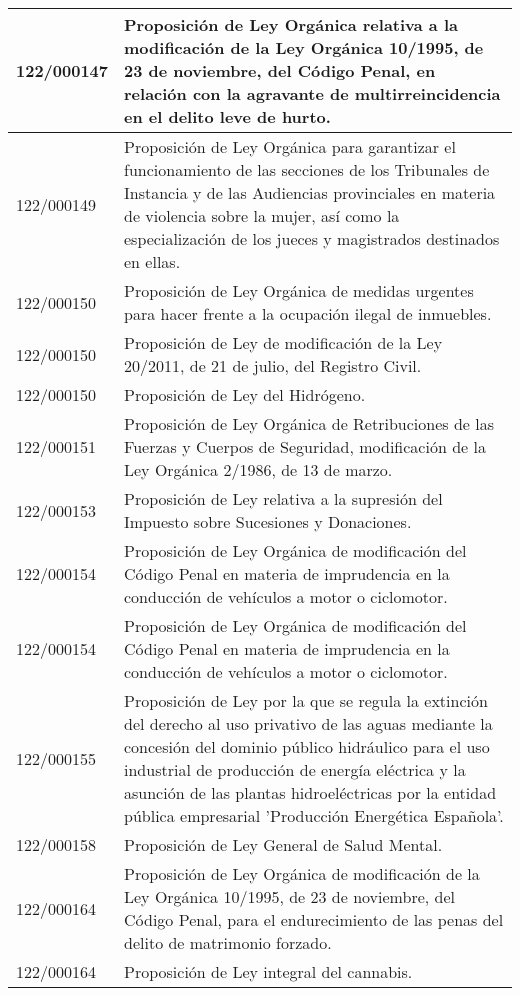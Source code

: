 {\begin{table}[H]
\begin{center}
\begin{tabularx}{\linewidth}{| l | X |}
\hline
122/000147 & Proposición de Ley Orgánica relativa a la modificación de la Ley Orgánica 10/1995, de 23 de noviembre, del Código Penal, en relación con la agravante de multirreincidencia en el delito leve de hurto. \\
\hline
122/000149 & Proposición de Ley Orgánica para garantizar el funcionamiento de las secciones de los Tribunales de Instancia y de las Audiencias provinciales en materia de violencia sobre la mujer, así como la especialización de los jueces y magistrados destinados en ellas. \\
\hline
122/000150 & Proposición de Ley Orgánica de medidas urgentes para hacer frente a la ocupación ilegal de inmuebles. \\
\hline
122/000150 & Proposición de Ley de modificación de la Ley 20/2011, de 21 de julio, del Registro Civil. \\
\hline
122/000150 & Proposición de Ley del Hidrógeno. \\
\hline
122/000151 & Proposición de Ley Orgánica de Retribuciones de las Fuerzas y Cuerpos de Seguridad, modificación de la Ley Orgánica 2/1986, de 13 de marzo. \\
\hline
122/000153 & Proposición de Ley relativa a la supresión del Impuesto sobre Sucesiones y Donaciones. \\
\hline
122/000154 & Proposición de Ley Orgánica de modificación del Código Penal en materia de imprudencia en la conducción de vehículos a motor o ciclomotor. \\
\hline
122/000154 & Proposición de Ley Orgánica de modificación del Código Penal en materia de imprudencia en la conducción de vehículos a motor o ciclomotor. \\
\hline
122/000155 & Proposición de Ley por la que se regula la extinción del derecho al uso privativo de las aguas mediante la concesión del dominio público hidráulico para el uso industrial de producción de energía eléctrica y la asunción de las plantas hidroeléctricas por la entidad pública empresarial 'Producción Energética Española'. \\
\hline
122/000158 & Proposición de Ley General de Salud Mental. \\
\hline
122/000164 & Proposición de Ley Orgánica de modificación de la Ley Orgánica 10/1995, de 23 de noviembre, del Código Penal, para el endurecimiento de las penas del delito de matrimonio forzado. \\
\hline
122/000164 & Proposición de Ley integral del cannabis. \\
\hline

\end{tabularx}
\end{center}
\end{table}}

